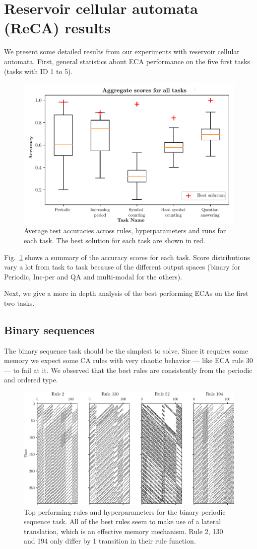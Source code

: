 \section{Reservoir cellular automata (ReCA) results}

We present some detailed results from our experiments with reservoir cellular
automata. First, general statistics about \ac{ECA} performance on the five first
tasks (tasks with ID 1 to 5).

\begin{figure}[htbp]
  \centering
  \includegraphics[width=.6\linewidth]{figures/aggregate_results.pdf}
  \caption{Average test accuracies across rules, hyperparameters and runs for
    each task. The best solution for each task are shown in
    red.}\label{fig:aggregate-results}
\end{figure}

Fig.~\ref{fig:aggregate-results} shows a summary of the accuracy scores for each
task. Score distributions vary a lot from task to task because of the different
output spaces (binary for Periodic, Inc-per and QA and multi-modal for the
others).

Next, we give a more in depth analysis of the best performing \acp{ECA} on the
first two tasks.

\subsection{Binary sequences}

The binary sequence task should be the simplest to solve. Since it requires some
memory we expect some CA rules with very chaotic behavior --- like ECA rule 30
--- to fail at it. We observed that the best rules are consistently from the
periodic and ordered type.

\begin{figure}[htbp]
  \centering
  \includegraphics[width=.6\linewidth]{figures/periodic_top.pdf}
  \caption{Top performing rules and hyperparameters for the binary periodic
    sequence task. All of the best rules seem to make use of a lateral
    translation, which is an effective memory mechanism. Rule 2, 130 and 194
    only differ by 1 transition in their rule
    function.}\label{fig:top-binary-seq}
\end{figure}

